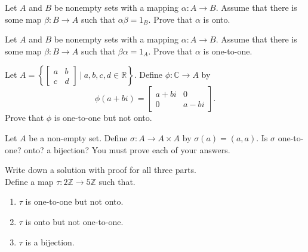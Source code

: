 
\newcommand{\C}{\mathbb{C}}
\newcommand{\R}{\mathbb{R}}
\newcommand{\Z}{\mathbb{Z}}


Let $A$ and $B$ be nonempty sets with a mapping $\alpha\colon A\to B$. Assume that there is some map $\beta:B\to A$ such that $\alpha\beta=1_B$. Prove that $\alpha$ is onto.
	

Let $A$ and $B$ be nonempty sets with a mapping $\alpha\colon A\to B$. Assume that there is some map $\beta:B\to A$ such that $\beta\alpha=1_A$. Prove that $\alpha$ is one-to-one.

	

Let $A=\left\{\begin{bmatrix}a&b\\c&d\end{bmatrix}\ |\ a,b,c,d\in\R\right\}$. Define $\phi\colon \C\to A$ by $$\phi(a+bi)=\begin{bmatrix}a+bi&0\\0&a-bi\end{bmatrix}.$$ Prove that $\phi$ is one-to-one but not onto.

	

Let $A$ be a non-empty set. Define $\sigma:A\to A\times A$ by $\sigma(a)=(a,a)$. Is $\sigma$ one-to-one? onto? a bijection? You must prove each of your answers.

	

Write down a solution with proof for all three parts. \\
    Define a map $\tau\colon 2\Z\to 5\Z$ such that.
    \begin{enumerate}
        \item $\tau$ is one-to-one but not onto.\vfill
        \item $\tau$ is onto but not one-to-one.\vfill
        \item $\tau$ is a bijection.\vfill
    \end{enumerate}